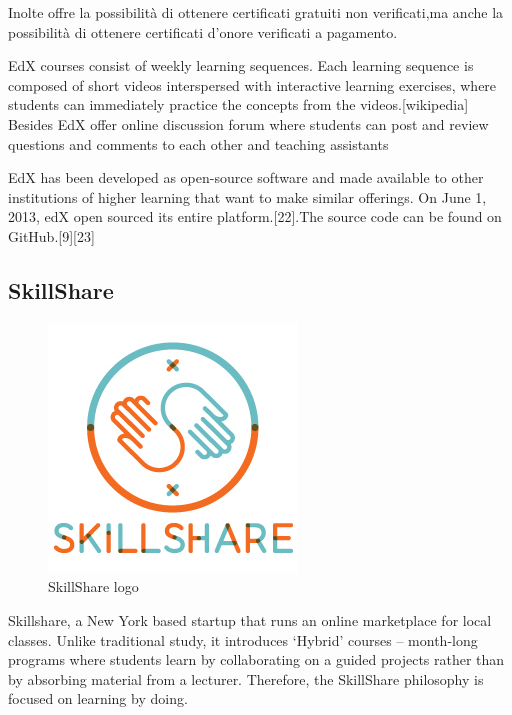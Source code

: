 Inolte offre la possibilità di ottenere certificati gratuiti non verificati,ma anche la possibilità di ottenere certificati d’onore verificati a pagamento.

EdX courses consist of weekly learning sequences. Each learning sequence is composed of short videos interspersed with interactive learning exercises, where students can immediately practice the concepts from the videos.[wikipedia]
Besides EdX offer online discussion forum where students can post and review questions and comments to each other and teaching assistants

EdX has been developed as open-source software and made available to other institutions of higher learning that want to make similar offerings. On June 1, 2013, edX open sourced its entire platform.[22].The source code can be found on GitHub.[9][23]


\subsection{SkillShare}
\label{subsec:SkillShare}
\begin{figure}[htb] %
 \centering
 \includegraphics[width=0.5\linewidth]{images/chapter1/skillshare.jpg}\hfill
 \caption[SkillShare logo]{SkillShare logo}
 \label{fig:fourV}
\end{figure}




Skillshare, a New York based startup that runs an online marketplace for local classes.
Unlike traditional study, it introduces ‘Hybrid’ courses – month-long programs where students learn by collaborating on a guided projects rather than by absorbing material from a lecturer. Therefore, the SkillShare philosophy is focused on learning by doing.

